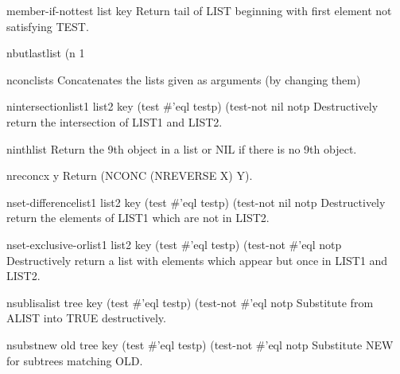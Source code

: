 \begin{function}{member-if-not}{test list \key key}{}
  Return tail of LIST beginning with first element not satisfying TEST.
\end{function}

\begin{function}{nbutlast}{list \op (n 1}{}
  
\end{function}

\begin{function}{nconc}{\rest lists}{}
  Concatenates the lists given as arguments (by changing them)
\end{function}

\begin{function}{nintersection}{list1 list2 \key key (test #'eql testp) (test-not nil notp}{}
  Destructively return the intersection of LIST1 and LIST2.
\end{function}

\begin{accessor}{ninth}{list}{}
  Return the 9th object in a list or NIL if there is no 9th object.
\end{accessor}

\begin{function}{nreconc}{x y}{}
  Return (NCONC (NREVERSE X) Y).
\end{function}

\begin{function}{nset-difference}{list1 list2 \key key (test #'eql testp) (test-not nil notp}{}
  Destructively return the elements of LIST1 which are not in LIST2.
\end{function}

\begin{function}{nset-exclusive-or}{list1 list2 \key key (test #'eql testp) (test-not #'eql notp}{}
  Destructively return a list with elements which appear but once in LIST1
   and LIST2.
\end{function}

\begin{function}{nsublis}{alist tree \key key (test #'eql testp) (test-not #'eql notp}{}
  Substitute from ALIST into TRUE destructively.
\end{function}

\begin{function}{nsubst}{new old tree \key key (test #'eql testp) (test-not #'eql notp}{}
  Substitute NEW for subtrees matching OLD.
\end{function}

